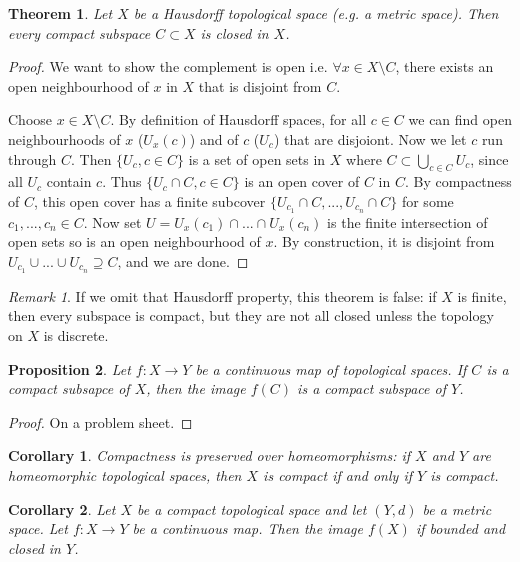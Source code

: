 \documentclass{article}
\theoremstyle{definition}
\theoremstyle{plain}%
\newtheorem{thm}{Theorem}[section]
\newtheorem{prop}[thm]{Proposition}
\newtheorem*{cor}{Corollary}
\theoremstyle{remark}
\newtheorem*{rem}{Remark}
\newcommand{\union}{\cup}
\newcommand{\Union}{\bigcup}
\newcommand{\intersection}{\cap}
\begin{document}
\begin{thm}
    Let $X$ be a Hausdorff topological space (e.g. a metric space). Then every compact subspace $C \subset X$ is closed in $X$.
\end{thm}

\begin{proof}
    We want to show the complement is open i.e. $\forall x \in X \setminus C$, there exists an open neighbourhood of $x$ in $X$ that is disjoint from $C$.
    
    Choose $x \in X \setminus C$. By definition of Hausdorff spaces, for all $c \in C$ we can find open neighbourhoods of $x$ ($U_x(c)$) and of $c$ ($U_c$) that are disjoiont. Now we let $c$ run through $C$. Then $\{U_c, c \in C\}$ is a set of open sets in $X$ where $C \subset \Union_{c \in C} U_c$, since all $U_c$ contain $c$. Thus $\{U_c \intersection C, c \in C\}$ is an open cover of $C$ in $C$. By compactness of $C$, this open cover has a finite subcover $\{U_{c_1} \intersection C, ..., U_{c_n} \intersection C\}$ for some $c_1, ..., c_n \in C$. Now set $U = U_{x}(c_1) \intersection ...  \intersection U_{x}(c_n)$ is the finite intersection of open sets so is an open neighbourhood of $x$. By construction, it is disjoint from $U_{c_1} \union ... \union U_{c_n} \supseteq C$, and we are done.
\end{proof}

\begin{rem}
    If we omit that Hausdorff property, this theorem is false: if $X$ is finite, then every subspace is compact, but they are not all closed unless the topology on $X$ is discrete. 
\end{rem}

\begin{prop}
    Let $f : X \to Y$ be a continuous map of topological spaces. If $C$ is a compact subsapce of $X$, then the image $f(C)$ is a compact subspace of $Y$.
\end{prop}

\begin{proof}
    On a problem sheet.
\end{proof}

\begin{cor}
    Compactness is preserved over homeomorphisms: if $X$ and $Y$ are homeomorphic topological spaces, then $X$ is compact if and only if $Y$ is compact.
\end{cor}

\begin{cor}\label{cor metirc maps}
    Let $X$ be a compact topological space and let $(Y,d)$ be a metric space. Let $f : X \to Y$ be a continuous map. Then the image $f(X)$ if bounded and closed in $Y$. 
\end{cor}
\end{document}
